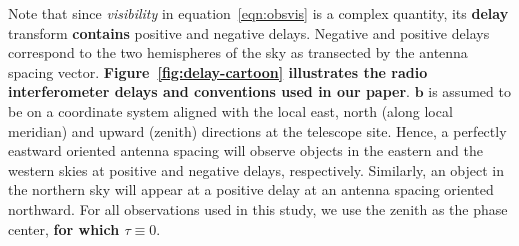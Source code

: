 \documentclass[preprint2,iop,numberedappendix,twocolappendix,appendixfloats]{emulateapj}
\begin{document}
Note that since {\it visibility} in equation~\ref{eqn:obsvis} is a complex quantity, its {\bf delay} transform {\bf contains} positive and negative delays. Negative and positive delays correspond to the two hemispheres of the sky as transected by the antenna spacing vector. {\bf Figure~\ref{fig:delay-cartoon} illustrates the radio interferometer delays and conventions used in our paper}. $\boldsymbol{b}$ is assumed to be on a coordinate system aligned with the local east, north (along local meridian) and upward (zenith) directions at the telescope site. Hence, a perfectly eastward oriented antenna spacing will observe objects in the eastern and the western skies at positive and negative delays, respectively. Similarly, an object in the northern sky will appear at a positive delay at an antenna spacing oriented northward. For all observations used in this study, we use the zenith as the phase center, {\bf for which $\tau\equiv 0$}. 
\end{document}
